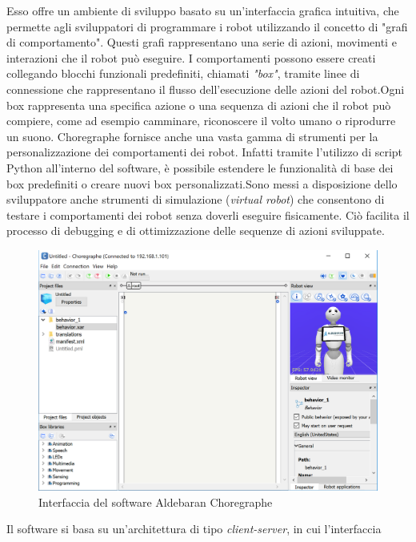 \begin{sloppypar}
{Esso offre un ambiente di sviluppo
basato su un’interfaccia grafica intuitiva, che permette agli sviluppatori di programmare
i robot utilizzando il concetto di "grafi di comportamento". Questi
grafi rappresentano una serie di azioni, movimenti e interazioni che il robot può
eseguire. I comportamenti possono essere creati collegando blocchi funzionali predefiniti,
chiamati \textit{"box"}, tramite linee di connessione che rappresentano il flusso
dell’esecuzione delle azioni del robot.\newline Ogni box rappresenta una specifica azione o una sequenza di azioni che il
robot può compiere, come ad esempio camminare, riconoscere il volto umano o
riprodurre un suono.\newline
Choregraphe fornisce anche una vasta gamma di strumenti per la personalizzazione
dei comportamenti dei robot. Infatti tramite l’utilizzo di script Python
all’interno del software, è possibile estendere le funzionalità di base dei box predefiniti o creare nuovi box personalizzati.\newline Sono messi a disposizione dello sviluppatore anche strumenti di simulazione (\textit{virtual robot}) che consentono di testare i comportamenti dei robot senza doverli eseguire fisicamente. Ciò facilita il processo di debugging e di ottimizzazione delle sequenze di azioni sviluppate.
\vspace{1cm}
\begin{figure}[H]
\centering
\includegraphics[width=1\textwidth]{immagini/Choregraphe.png}
\caption{Interfaccia del software Aldebaran Choregraphe}
\end{figure}
\vspace{1cm}
Il software si basa su un’architettura di tipo \textit{client-server}, in cui l’interfaccia
}
\end{sloppypar}
